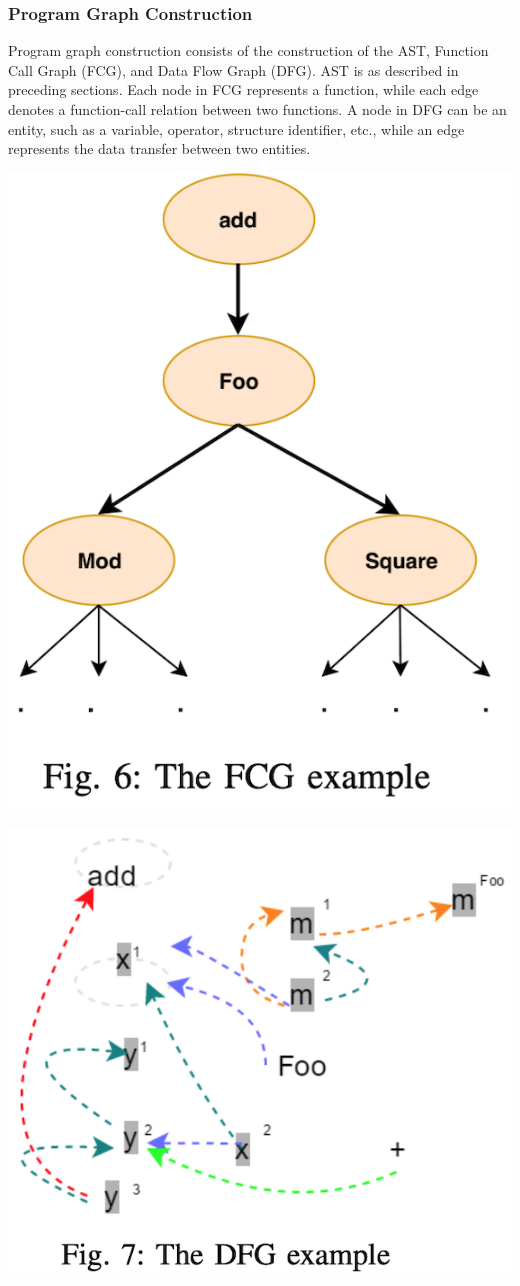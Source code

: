 \documentclass{article}
\begin{document}
\subsubsection{Program Graph Construction}
Program graph construction consists of the construction of the AST, Function Call Graph (FCG), and Data Flow Graph (DFG).
AST is as described in preceding sections. Each node in FCG represents a function, while each edge denotes a function-call relation between two functions.
A node in DFG can be an entity, such as a variable, operator, structure identifier, etc., while an edge represents the data transfer between two entities.
\centerline{\includegraphics[width=\columnwidth]{Images/Similarity2-5a.png}}
\centerline{\includegraphics[width=\columnwidth]{Images/Similarity2-5b.png}}
\end{document}
